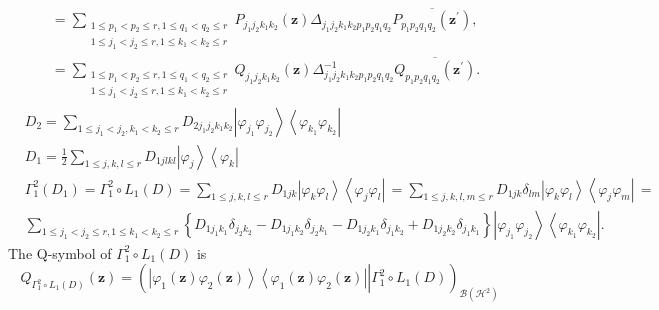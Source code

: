 \documentclass[aps,preprint]{revtex4}%
\begin{document}
\begin{align}
&  =\sum_{\substack{1\leq p_{1}<p_{2}\leq r,1\leq q_{1}<q_{2}\leq r\\1\leq
j_{1}<j_{2}\leq r,1\leq k_{1}<k_{2}\leq r}}P_{j_{1}j_{2}k_{1}k_{2}}\left(
\mathbf{z}\right)  \Delta_{j_{1}j_{2}k_{1}k_{2}p_{1}p_{2}q_{1}q_{2}}%
\overline{P_{p_{1}p_{2}q_{1}q_{2}}\left(  \mathbf{z}^{\prime}\right)
},\nonumber\\
&  =\sum_{\substack{1\leq p_{1}<p_{2}\leq r,1\leq q_{1}<q_{2}\leq r\\1\leq
j_{1}<j_{2}\leq r,1\leq k_{1}<k_{2}\leq r}}Q_{j_{1}j_{2}k_{1}k_{2}}\left(
\mathbf{z}\right)  \Delta_{j_{1}j_{2}k_{1}k_{2}p_{1}p_{2}q_{1}q_{2}}%
^{-1}\overline{Q_{p_{1}p_{2}q_{1}q_{2}}\left(  \mathbf{z}^{\prime}\right)  }.
\end{align}%
\begin{align}
&  D_{2}=\sum_{1\leq j_{1}<j_{2},k_{1}<k_{2}\leq r}D_{2j_{1}j_{2}k_{1}k_{2}%
}\left\vert \varphi_{j_{1}}\varphi_{j_{2}}\right\rangle \left\langle
\varphi_{k_{1}}\varphi_{k_{2}}\right\vert \nonumber\\
&  D_{1}=\frac{1}{2}\sum_{1\leq j,k,l\leq r}D_{1jlkl}\left\vert \varphi
_{j}\right\rangle \left\langle \varphi_{k}\right\vert \nonumber\\
&  \Gamma_{1}^{2}\left(  D_{1}\right)  =\Gamma_{1}^{2}\circ L_{1}\left(
D\right)  =\sum_{1\leq j,k,l\leq r}D_{1jk}\left\vert \varphi_{k}\varphi
_{l}\right\rangle \left\langle \varphi_{j}\varphi_{l}\right\vert
\,=\sum_{1\leq j,k,l,m\leq r}D_{1jk}\delta_{lm}\left\vert \varphi_{k}%
\varphi_{l}\right\rangle \left\langle \varphi_{j}\varphi_{m}\right\vert
\,=\nonumber\\
&  \sum_{1\leq j_{1}<j_{2}\leq r,1\leq k_{1}<k_{2}\leq r}\left\{
D_{1j_{1}k_{1}}\delta_{j_{2}k_{2}}-D_{1j_{1}k_{2}}\delta_{j_{2}k_{1}%
}-D_{1j_{2}k_{1}}\delta_{j_{1}k_{2}}+D_{1j_{2}k_{2}}\delta_{j_{1}k_{1}%
}\right\}  \left\vert \varphi_{j_{1}}\varphi_{j_{2}}\right\rangle \left\langle
\varphi_{k_{1}}\varphi_{k_{2}}\right\vert .
\end{align}
The Q-symbol of $\Gamma_{1}^{2}\circ L_{1}\left(  D\right)  $ is
\begin{equation}
Q_{\Gamma_{1}^{2}\circ L_{1}\left(  D\right)  }\left(  \mathbf{z}\right)
=\left(  \left.  \overset{}{\left\vert \varphi_{1}\left(  \mathbf{z}\right)
\varphi_{2}\left(  \mathbf{z}\right)  \right\rangle \left\langle \varphi
_{1}\left(  \mathbf{z}\right)  \varphi_{2}\left(  \mathbf{z}\right)
\right\vert }\right\vert \Gamma_{1}^{2}\circ L_{1}\left(  D\right)  \right)
_{\mathcal{B}\left(  \mathcal{H}^{2}\right)  }%
\end{equation}
\end{document}
